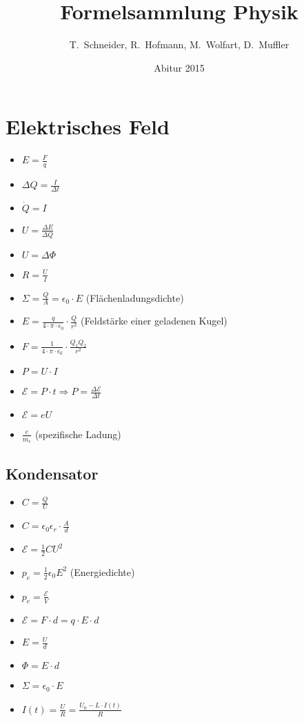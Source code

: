 \documentclass[paper = a4, twocolumn]{scrartcl}
\title{Formelsammlung Physik}
\author{T.~Schneider, R.~Hofmann, M.~Wolfart, D.~Muffler}
\date{Abitur 2015}
\DeclareRobustCommand{\E}{\mathcal{E}}
\begin{document}
\maketitle
\tableofcontents

\section{Elektrisches Feld}
\begin{itemize}
\item
	\( E = \frac{F}{q} \)
\item
	\( \Delta Q = \frac{I}{\Delta t} \)
\item
	\( \dot{Q} = I \)
\item
	\( U = \frac{\Delta E}{\Delta Q} \)
\item
	\( U = \Delta \Phi \)
\item
	\( R = \frac{U}{I} \)
\item
	\( \Sigma = \frac{Q}{A} = \epsilon_0 \cdot E \) (Flächenladungsdichte)
\item
	\( E = \frac{q}{4 \cdot \pi \cdot \epsilon_0} \cdot \frac{Q}{r^2} \)
	(Feldstärke einer geladenen Kugel)
\item
	\( F = \frac{1}{4 \cdot \pi \cdot \epsilon_0} \cdot \frac{Q_1 Q_2}{r^2} \)
\item
	\( P = U \cdot I \)
\item
	\( \E = P \cdot t \Rightarrow P = \frac{\Delta \E}{\Delta t} \)
\item
	\( \E = eU \)
\item
	\( \frac{e}{m_e} \) (spezifische Ladung)
\end{itemize}

\subsection{Kondensator}
\begin{itemize}
\item
	\( C = \frac{Q}{U} \)
\item
	\( C = \epsilon_0 \epsilon_r \cdot \frac{A}{d} \)
\item
	\( \E = \frac{1}{2} C U^2 \)
\item
	\( p_e = \frac{1}{2} \epsilon_0 E^2 \) (Energiedichte)
\item
	\( p_e = \frac{\E}{V} \)
\item
	\( \E = F \cdot d = q \cdot E \cdot d \)
\item
	\( E = \frac{U}{d} \)
\item
	\( \Phi = E \cdot d \)
\item
	\( \Sigma = \epsilon_0 \cdot E \)
\item
	\( I(t) = \frac{U}{R} = \frac{U_0 - L \cdot \dot{I}(t)}{R} \)
\end{itemize}
\end{document}

